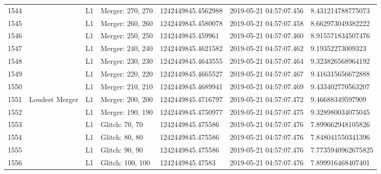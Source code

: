 \begin{longtable}{lllllll}
1544 &                                                    &       L1 &  Merger: 270, 270 &  1242449845.4562988 &  2019-05-21 04:57:07.456 &   8.431214788775073 \\
1545 &                                                    &       L1 &  Merger: 260, 260 &  1242449845.4580078 &  2019-05-21 04:57:07.458 &   8.662973049382222 \\
1546 &                                                    &       L1 &  Merger: 250, 250 &   1242449845.459961 &  2019-05-21 04:57:07.460 &   8.915571834507476 \\
1547 &                                                    &       L1 &  Merger: 240, 240 &  1242449845.4621582 &  2019-05-21 04:57:07.462 &    9.19352273009323 \\
1548 &                                                    &       L1 &  Merger: 230, 230 &  1242449845.4643555 &  2019-05-21 04:57:07.464 &   9.323826568964192 \\
1549 &                                                    &       L1 &  Merger: 220, 220 &  1242449845.4665527 &  2019-05-21 04:57:07.467 &   9.416315656672888 \\
1550 &                                                    &       L1 &  Merger: 210, 210 &  1242449845.4689941 &  2019-05-21 04:57:07.469 &   9.433402770563207 \\
1551 &                                     Loudest Merger &       L1 &  Merger: 200, 200 &  1242449845.4716797 &  2019-05-21 04:57:07.472 &    9.46688349597909 \\
1552 &                                                    &       L1 &  Merger: 190, 190 &  1242449845.4750977 &  2019-05-21 04:57:07.475 &   9.328980034075045 \\
1553 &                                                    &       L1 &    Glitch: 70, 70 &   1242449845.475586 &  2019-05-21 04:57:07.476 &   7.899662948105826 \\
1554 &                                                    &       L1 &    Glitch: 80, 80 &   1242449845.475586 &  2019-05-21 04:57:07.476 &   7.848041550341396 \\
1555 &                                                    &       L1 &    Glitch: 90, 90 &   1242449845.475586 &  2019-05-21 04:57:07.476 &  7.7735940962675825 \\
1556 &                                                    &       L1 &  Glitch: 100, 100 &    1242449845.47583 &  2019-05-21 04:57:07.476 &   7.899916468407401 \\

\end{longtable}
